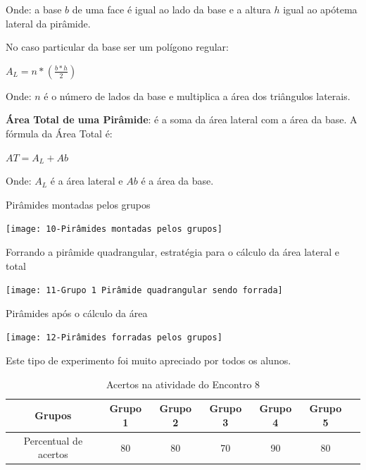 Onde: a base $b$ de uma face é igual ao lado da base e a altura $h$ igual ao apótema lateral da pirâmide.

No caso particular da base ser um polígono regular:

\textcolor[HTML]{0000FF}{$A_L = n * \left( \frac{b*h}{2}  \right)$}

Onde: $n$ é o número de lados da base e multiplica a área dos triângulos laterais.

\textbf{Área Total de uma Pirâmide}: é a soma da área lateral com a área da base. A fórmula da Área Total é:

\textcolor[HTML]{0000FF}{$AT = A_L + Ab$}

Onde: $A_L$ é a área lateral e $Ab$ é a área da base.

\begin{CenteredFigure}
    \caption{Pirâmides montadas pelos grupos} \label{fig:10-piramides montadas}
    \texttt{[image: 10-Pirâmides montadas pelos grupos]}
    \legend{\autoria}
\end{CenteredFigure}

\begin{CenteredFigure}
    \caption{Forrando a pirâmide quadrangular, estratégia para o cálculo da área lateral e total} \label{fig:11-grupo 1 forrando}
    \texttt{[image: 11-Grupo 1 Pirâmide quadrangular sendo forrada]}
    \legend{\autoria}
\end{CenteredFigure}

\begin{CenteredFigure}
    \caption{Pirâmides após o cálculo da área} \label{fig:12-piramides forradas}
    \texttt{[image: 12-Pirâmides forradas pelos grupos]}
    \legend{\autoria}
\end{CenteredFigure}

Este tipo de experimento foi muito apreciado por todos os alunos.

\begin{table}[htbp] \centering
    \caption{Acertos na atividade do Encontro 8} \label{tab:Acertos do Encontro 8}

    \begin{tabular}{|c|c|c|c|c|c|c|}
        \hline
        \textbf{Grupos}       & \textbf{Grupo 1} & \textbf{Grupo 2} & \textbf{Grupo 3} & \textbf{Grupo 4} & \textbf{Grupo 5} \\
        \hline
        Percentual de acertos & 80               & 80               & 70               & 90               & 80               \\
        \hline
    \end{tabular}
    \legend{\legendaTabela}
\end{table}

